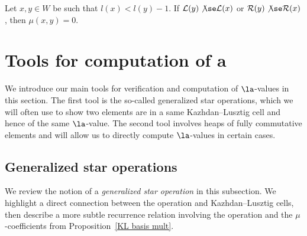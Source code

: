  \begin{prop}
 \label{extremal}
 Let $x,y\in W$ be such that $l(x)<l(y)-1$. If $\mathcal{L}(y)\not\se
 \mathcal{L}(x)$ or $\mathcal{R}(y)\not\se\mathcal{R}(x)$, then $\mu(x,y)=0$.
 \end{prop}


 \section{Tools for computation of \texorpdfstring{$\mathbf{a}$}{a}}
 \label{sec:tools}
 We introduce our main tools for verification and computation of
 $\la$-values in this section. The first tool is the so-called
 generalized star operations, which we will often use to show two elements
 are in a same Kazhdan--Lusztig cell and hence of the same $\la$-value.
 The second tool involves heaps of fully commutative elements and will
 allow us to directly compute $\la$-values in certain cases.
 

 \subsection{Generalized star operations}
 \label{star}
 We review the notion of a
 \emph{generalized star operation} in this subsection. We highlight a
 direct connection between the operation and Kazhdan--Lusztig cells, then describe
 a more subtle recurrence relation involving the operation and the
 $\mu$-coefficients from Proposition~\ref{KL basis mult}. 

